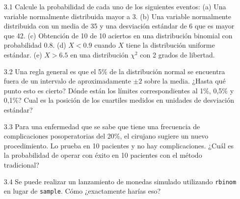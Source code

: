 \begin{enumerate}

    \item[3.1]
     Calcule la probabilidad de cada uno de los siguientes eventos:
    (a) Una variable normalmente distribuida mayor a 3. (b) Una variable normalmente
    distribuida con un media de 35 y una desviación estándar de 6 que es mayor que
    42. (c) Obtención de 10 de 10 aciertos en una distribución binomial con
    probabilidad 0.8. (d) $X < 0.9$ cuando $X$ tiene la distribución uniforme
    estándar. (e) $X > 6.5$ en una distribución $\chi^{2}$ con 2 grados de libertad.

    \item[3.2]
    Una regla general es que el 5\% de la distribución normal se encuentra fuera de
    un intervalo de aproximadamente $\pm2$ sobre la media. ¿Hasta qué punto esto es
    cierto? Dónde están los límites correspondientes al 1\%, 0,5\% y 0,1\%? Cual es
    la posición de los cuartiles medidos en unidades de desviación estándar?

    \item[3.3]
    Para una enfermedad que se sabe que tiene una frecuencia de complicaciones
    posoperatorias del 20\%, el cirujano sugiere un nuevo procedimiento. Lo prueba
    en 10 pacientes y no hay complicaciones. ¿Cuál es la probabilidad de operar con
    éxito en 10 pacientes con el método tradicional?

    \item[3.4]
    Se puede realizar un lanzamiento de monedas simulado utilizando
    \texttt{rbinom} en lugar de \texttt{sample}. Cómo ¿exactamente harías eso?


\end{enumerate}
